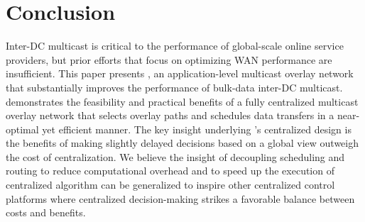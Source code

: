 \section{Conclusion}
Inter-DC multicast is critical to the performance of
global-scale online service providers, but
prior efforts that focus
on optimizing WAN performance are insufficient.
This paper presents \name,
an application-level multicast overlay network that substantially
improves the performance of
bulk-data inter-DC multicast.
\name demonstrates the feasibility
and practical benefits of a fully centralized multicast overlay
network that selects overlay paths and schedules data transfers
in a near-optimal yet efficient manner.
The key insight underlying \name's centralized design is
the benefits of making slightly delayed
decisions based on a global view outweigh the cost of
centralization.%
We believe the insight of decoupling scheduling and routing to reduce computational overhead and to speed up the execution of centralized algorithm
can be generalized to inspire other centralized control platforms
where centralized decision-making strikes
a favorable balance between costs and benefits.
